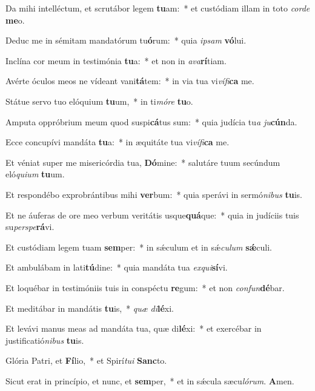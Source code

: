 ﻿\item Da mihi intelléctum, et scrutábor legem \textbf{tu}am:~* et custódiam illam in toto \emph{cor}\emph{de} \textbf{me}o.
\item Deduc me in sémitam mandatórum tu\textbf{ó}rum:~* quia \emph{ip}\emph{sam} \textbf{vó}lui.
\item Inclína cor meum in testimónia \textbf{tu}a:~* et non in \emph{a}\emph{va}\textbf{rí}tiam.
\item Avérte óculos meos ne vídeant vani\textbf{tá}tem:~* in via tua vi\emph{ví}\emph{fi}\textbf{ca} me.
\item Státue servo tuo elóquium \textbf{tu}um,~* in ti\emph{mó}\emph{re} \textbf{tu}o.
\item Amputa oppróbrium meum quod suspi\textbf{cá}tus sum:~* quia judícia tu\emph{a} \emph{ju}\textbf{cún}da.
\item Ecce concupívi mandáta \textbf{tu}a:~* in æquitáte tua vi\emph{ví}\emph{fi}\textbf{ca} me.
\item Et véniat super me misericórdia tua, \textbf{Dó}mine:~* salutáre tuum secúndum eló\emph{qui}\emph{um} \textbf{tu}um.
\item Et respondébo exprobrántibus mihi \textbf{ver}bum:~* quia sperávi in sermó\emph{ni}\emph{bus} \textbf{tu}is.
\item Et ne áuferas de ore meo verbum veritátis usque\textbf{quá}que:~* quia in judíciis tuis su\emph{per}\emph{spe}\textbf{rá}vi.
\item Et custódiam legem tuam \textbf{sem}per:~* in sǽculum et in sǽ\emph{cu}\emph{lum} \textbf{sǽ}culi.
\item Et ambulábam in lati\textbf{tú}dine:~* quia mandáta tua \emph{ex}\emph{qui}\textbf{sí}vi.
\item Et loquébar in testimóniis tuis in conspéctu \textbf{re}gum:~* et non \emph{con}\emph{fun}\textbf{dé}bar.
\item Et meditábar in mandátis \textbf{tu}is,~* \emph{quæ} \emph{di}\textbf{lé}xi.
\item Et levávi manus meas ad mandáta tua, quæ di\textbf{lé}xi:~* et exercébar in justificatió\emph{ni}\emph{bus} \textbf{tu}is.
\item Glória Patri, et \textbf{Fí}lio,~* et Spirí\emph{tu}\emph{i} \textbf{Sanc}to.
\item Sicut erat in princípio, et nunc, et \textbf{sem}per,~* et in sǽcula sæcu\emph{ló}\emph{rum}. \textbf{A}men.